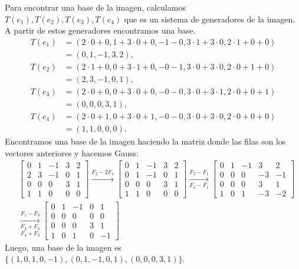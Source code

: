 \begin{enumerate}[topsep=6pt, itemsep=.4cm]
    Para encontrar una base de la imagen, calculamos $T(e_1),T(e_2),T(e_3),T(e_4)$ que es un sistema de generadores de la imagen. A partir de estos generadores encontramos una base.
    \begin{align*}
        T(e_1) &= (2\cdot 0+0,1+3\cdot 0+0,-1-0,3\cdot 1+3\cdot 0,2\cdot 1+0+0)\\ &= (0,1,-1,3,2), 
    \end{align*}
    \begin{align*}
        T(e_2) &= (2\cdot 1+0,0+3\cdot 1+0,-0-1,3\cdot 0+3\cdot 0,2\cdot 0+1+0)\\ &= (2,3,-1,0,1), 
    \end{align*}
    \begin{align*}
        T(e_3) &= (2\cdot 0+0,0+3\cdot 0+0,-0-0,3\cdot 0+3\cdot 1,2\cdot 0+0+1)\\ &= (0,0,0,3,1), 
    \end{align*}
    \begin{align*}
        T(e_4) &= (2\cdot 0+1,0+3\cdot 0+1,-0-0,3\cdot 0+3\cdot 0,2\cdot 0+0+0)\\ &= (1,1,0,0,0).
    \end{align*}
    Encontramos una base de la imagen haciendo la matriz donde las filas son los vectores anteriores y hacemos Gauss:
    \begin{align*}
        &\begin{bmatrix}
            0 & 1 & -1 &3 &2\\
            2 & 3 & -1 &0 &1\\
            0 & 0 & 0 &3 &1\\
            1 & 1 & 0 &0 &0
        \end{bmatrix}
        \stackrel{F_2-2F_4}{\longrightarrow}
        \begin{bmatrix}
            0 & 1 & -1 &3 &2\\
            0 & 1 & -1 &0 &1\\
            0 & 0 & 0 &3 &1\\
            1 & 1 & 0 &0 &0
        \end{bmatrix}
        \underset{F_4-F_1}{\stackrel{F_2-F_1}{\longrightarrow}}
        \begin{bmatrix}
            0 & 1 & -1 &3 &2\\
            0 & 0 & 0 &-3 &-1\\
            0 & 0 & 0 &3 &1\\
            1 & 0 & 1 &-3 &-2
        \end{bmatrix} \\
        &\underset{F_4+F_3}{\underset{F_2+F_3}{\stackrel{F_1-F_3}{\longrightarrow}}}
        \begin{bmatrix}
            0 & 1 & -1 &0 &1\\
            0 & 0 & 0 &0 &0\\
            0 & 0 & 0 &3 &1\\
            1 & 0 & 1 &0 &-1
        \end{bmatrix}
    \end{align*}
    Luego, una base de la imagen es $\{(1,0,1,0,-1),(0, 1, -1, 0, 1),(0,0,0,3,1)\}$.


\end{enumerate}
